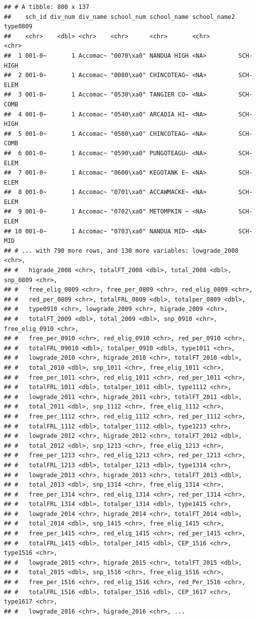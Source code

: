 \documentclass[
]{book}
\begin{document}
\begin{verbatim}
## # A tibble: 800 x 137
##    sch_id div_num div_name school_num school_name school_name2 type0809
##    <chr>    <dbl> <chr>    <chr>      <chr>       <chr>        <chr>   
##  1 001-0~       1 Accomac~ "0070\xa0" NANDUA HIGH <NA>         SCH-HIGH
##  2 001-0~       1 Accomac~ "0080\xa0" CHINCOTEAG~ <NA>         SCH-ELEM
##  3 001-0~       1 Accomac~ "0530\xa0" TANGIER CO~ <NA>         SCH-COMB
##  4 001-0~       1 Accomac~ "0540\xa0" ARCADIA HI~ <NA>         SCH-HIGH
##  5 001-0~       1 Accomac~ "0580\xa0" CHINCOTEAG~ <NA>         SCH-COMB
##  6 001-0~       1 Accomac~ "0590\xa0" PUNGOTEAGU~ <NA>         SCH-ELEM
##  7 001-0~       1 Accomac~ "0600\xa0" KEGOTANK E~ <NA>         SCH-ELEM
##  8 001-0~       1 Accomac~ "0701\xa0" ACCAWMACKE~ <NA>         SCH-ELEM
##  9 001-0~       1 Accomac~ "0702\xa0" METOMPKIN ~ <NA>         SCH-ELEM
## 10 001-0~       1 Accomac~ "0703\xa0" NANDUA MID~ <NA>         SCH-MID 
## # ... with 790 more rows, and 130 more variables: lowgrade_2008 <chr>,
## #   higrade_2008 <chr>, totalFT_2008 <dbl>, total_2008 <dbl>, snp_0809 <chr>,
## #   free_elig_0809 <chr>, free_per_0809 <chr>, red_elig_0809 <chr>,
## #   red_per_0809 <chr>, totalFRL_0809 <dbl>, totalper_0809 <dbl>,
## #   type0910 <chr>, lowgrade_2009 <chr>, higrade_2009 <chr>,
## #   totalFT_2009 <dbl>, total_2009 <dbl>, snp_0910 <chr>, free_elig_0910 <chr>,
## #   free_per_0910 <chr>, red_elig_0910 <chr>, red_per_0910 <chr>,
## #   totalFRL_09010 <dbl>, totalper_0910 <dbl>, type1011 <chr>,
## #   lowgrade_2010 <chr>, higrade_2010 <chr>, totalFT_2010 <dbl>,
## #   total_2010 <dbl>, snp_1011 <chr>, free_elig_1011 <chr>,
## #   free_per_1011 <chr>, red_elig_1011 <chr>, red_per_1011 <chr>,
## #   totalFRL_1011 <dbl>, totalper_1011 <dbl>, type1112 <chr>,
## #   lowgrade_2011 <chr>, higrade_2011 <chr>, totalFT_2011 <dbl>,
## #   total_2011 <dbl>, snp_1112 <chr>, free_elig_1112 <chr>,
## #   free_per_1112 <chr>, red_elig_1112 <chr>, red_per_1112 <chr>,
## #   totalFRL_1112 <dbl>, totalper_1112 <dbl>, type1213 <chr>,
## #   lowgrade_2012 <chr>, higrade_2012 <chr>, totalFT_2012 <dbl>,
## #   total_2012 <dbl>, snp_1213 <chr>, free_elig_1213 <chr>,
## #   free_per_1213 <chr>, red_elig_1213 <chr>, red_per_1213 <chr>,
## #   totalFRL_1213 <dbl>, totalper_1213 <dbl>, type1314 <chr>,
## #   lowgrade_2013 <chr>, higrade_2013 <chr>, totalFT_2013 <dbl>,
## #   total_2013 <dbl>, snp_1314 <chr>, free_elig_1314 <chr>,
## #   free_per_1314 <chr>, red_elig_1314 <chr>, red_per_1314 <chr>,
## #   totalFRL_1314 <dbl>, totalper_1314 <dbl>, type1415 <chr>,
## #   lowgrade_2014 <chr>, higrade_2014 <chr>, totalFT_2014 <dbl>,
## #   total_2014 <dbl>, snp_1415 <chr>, free_elig_1415 <chr>,
## #   free_per_1415 <chr>, red_elig_1415 <chr>, red_per_1415 <chr>,
## #   totalFRL_1415 <dbl>, totalper_1415 <dbl>, CEP_1516 <chr>, type1516 <chr>,
## #   lowgrade_2015 <chr>, higrade_2015 <chr>, totalFT_2015 <dbl>,
## #   total_2015 <dbl>, snp_1516 <chr>, free_elig_1516 <chr>,
## #   free_per_1516 <chr>, red_elig_1516 <chr>, red_Per_1516 <chr>,
## #   totalFRL_1516 <dbl>, totalper_1516 <dbl>, CEP_1617 <chr>, type1617 <chr>,
## #   lowgrade_2016 <chr>, higrade_2016 <chr>, ...
\end{verbatim}
\end{document}
